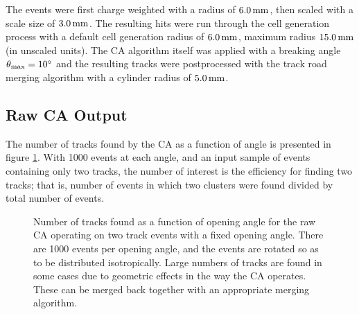 The events were first charge weighted with a radius of $6.0\,\mathrm{mm}$, then scaled with a scale size of $3.0\,\mathrm{mm}$. The resulting hits were run through the cell generation process with a default cell generation radius of $6.0\,\mathrm{mm}$, maximum radius $15.0\,\mathrm{mm}$ (in unscaled units). The \ac{CA} algorithm itself was applied with a breaking angle $\theta_\mathrm{max} = 10^\circ$ and the resulting tracks were postprocessed with the track road merging algorithm with a cylinder radius of $5.0\,\mathrm{mm}$.

\subsection{Raw \acl{CA} Output}
The number of tracks found by the \ac{CA} as a function of angle is presented in figure \ref{fig:ca_toy_raw_trackcounts}. With 1000 events at each angle, and an input sample of events containing only two tracks, the number of interest is the efficiency for finding two tracks; that is, number of events in which two clusters were found divided by total number of events.%

\begin{figure}
\centering
\caption[Track count as a function of angle for raw CA operating on toy MC events]{\label{fig:ca_toy_raw_trackcounts}Number of tracks found as a function of opening angle for the raw \ac{CA} operating on two track events with a fixed opening angle. There are 1000 events per opening angle, and the events are rotated so as to be distributed isotropically. Large numbers of tracks are found in some cases due to geometric effects in the way the \ac{CA} operates. These can be merged back together with an appropriate merging algorithm.}
\end{figure}

